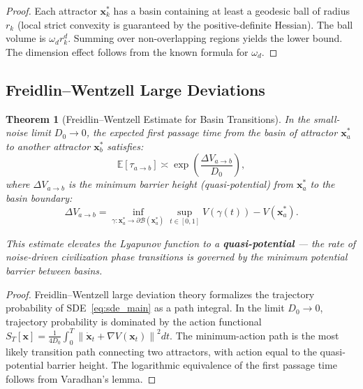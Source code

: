 \documentclass[12pt,a4paper]{article}
\newtheorem{theorem}{Theorem}[section]
\theoremstyle{definition}
\newcommand{\E}{\mathbb{E}}
\newcommand{\norm}[1]{\left\|#1\right\|}
\newcommand{\paren}[1]{\left(#1\right)}
\newcommand{\calB}{\mathcal{B}}
\newcommand{\Lyap}{V}
\newcommand{\grad}{\nabla}
\begin{document}
\begin{proof}
Each attractor $\mathbf{x}^*_k$ has a basin containing at least a geodesic ball of radius $r_k$ (local strict convexity is guaranteed by the positive-definite Hessian). The ball volume is $\omega_d r_k^d$. Summing over non-overlapping regions yields the lower bound. The dimension effect follows from the known formula for $\omega_d$.
\end{proof}

\subsection{Freidlin--Wentzell Large Deviations}
\label{sec:freidlin}

\begin{theorem}[Freidlin--Wentzell Estimate for Basin Transitions]
\label{thm:freidlin}
In the small-noise limit $D_0 \to 0$, the expected first passage time from the basin of attractor $\mathbf{x}^*_a$ to another attractor $\mathbf{x}^*_b$ satisfies:
\begin{equation}\label{eq:freidlin}
    \E[\tau_{a \to b}] \asymp \exp\paren{\frac{\Delta \Lyap_{a \to b}}{D_0}},
\end{equation}
where $\Delta \Lyap_{a \to b}$ is the minimum barrier height (quasi-potential) from $\mathbf{x}^*_a$ to the basin boundary:
\begin{equation}\label{eq:quasi_potential}
    \Delta \Lyap_{a \to b} = \inf_{\gamma: \mathbf{x}^*_a \to \partial \calB(\mathbf{x}^*_a)} \sup_{t \in [0,1]} \Lyap(\gamma(t)) - \Lyap(\mathbf{x}^*_a).
\end{equation}

This estimate elevates the Lyapunov function to a \textbf{quasi-potential} --- the rate of noise-driven civilization phase transitions is governed by the minimum potential barrier between basins.
\end{theorem}

\begin{proof}
Freidlin--Wentzell large deviation theory formalizes the trajectory probability of SDE~\eqref{eq:sde_main} as a path integral. In the limit $D_0 \to 0$, trajectory probability is dominated by the action functional $S_T[\mathbf{x}] = \frac{1}{4D_0} \int_0^T \norm{\dot{\mathbf{x}}_t + \grad \Lyap(\mathbf{x}_t)}^2 dt$. The minimum-action path is the most likely transition path connecting two attractors, with action equal to the quasi-potential barrier height. The logarithmic equivalence of the first passage time follows from Varadhan's lemma.
\end{proof}
\end{document}
